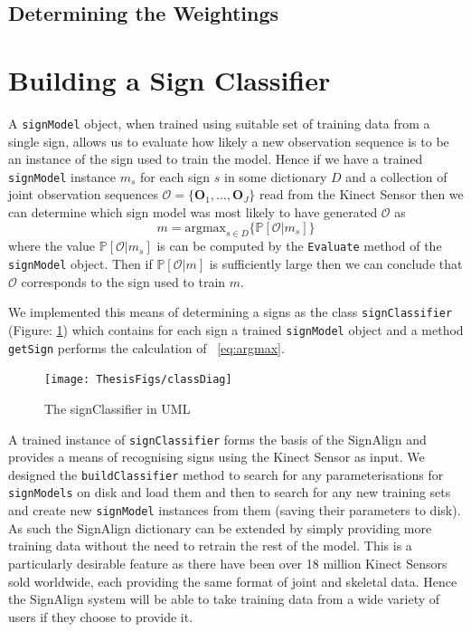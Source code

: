\subsection{Determining the Weightings}

\section{Building a Sign Classifier}
A \verb|signModel| object, when trained using suitable set of training data from a single sign, allows us to evaluate how likely a new observation sequence is to be an instance of the sign used to train the model. Hence if we have a trained \verb|signModel| instance $m_s$ for each sign $s$ in some dictionary $D$ and a collection of joint observation sequences $\mathcal{O} = \{\mathbf{O}_1, \dots, \mathbf{O}_J\}$ read from the Kinect Sensor then we can determine which sign model was most likely to have generated $\mathcal{O}$ as
\begin{equation*}
m = \text{argmax}_{s \in D}\{ \mathbb{P}[\mathcal{O}|m_s]  \}  \label{eq:argmax} \tag{*}
\end{equation*}
where the value $\mathbb{P}[\mathcal{O}|m_s]$ is can be computed by the \verb|Evaluate| method of the \verb|signModel| object. Then if $\mathbb{P}[\mathcal{O}|m]$ is sufficiently large then we can conclude that $\mathcal{O}$ corresponds to the sign used to train $m$. 

We implemented this means of determining a signs as the class \verb|signClassifier| (Figure: \ref{fig:scuml}) which contains for each sign a trained \verb|signModel| object and a method \verb|getSign| performs the calculation of ~\eqref{eq:argmax}.
\begin{figure}[h!]
        \centering
        \texttt{[image: ThesisFigs/classDiag]}
        \caption{The signClassifier in UML}\label{fig:scuml}
\end{figure}

A trained instance of \verb|signClassifier| forms the basis of the SignAlign and provides a means of recognising signs using the Kinect Sensor as input. We designed the \verb|buildClassifier| method to search for any parameterisations for \verb|signModels| on disk and load them and then to search for any new training sets and create new \verb|signModel| instances from them (saving their parameters to disk). As such the SignAlign dictionary can be extended by simply providing more training data without the need to retrain the rest of the model. This is a particularly desirable feature as there have been over 18 million Kinect Sensors sold worldwide, each providing the same format of joint and skeletal data. Hence the SignAlign system will be able to take training data from a wide variety of users if they choose to provide it.

